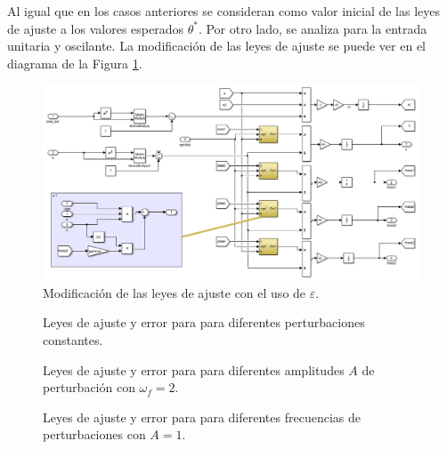 \documentclass[letterpaper,11pt]{article} %
\begin{document}
Al igual que en los casos anteriores se consideran como valor inicial de las leyes de ajuste a los valores esperados $\theta^*$. Por otro lado, se analiza para la entrada unitaria y oscilante. La modificación de las leyes de ajuste se puede ver en el diagrama de la Figura \ref{e1}.
\begin{figure}
	\centering
	\includegraphics[width=14cm]{e1.png}
	\caption{Modificación de las leyes de ajuste con el uso de $\varepsilon$.}
	\label{e1}
\end{figure}
\newpage
\begin{figure}[h]
	\centering
	\captionsetup{justification=centering}
	\caption{Leyes de ajuste y error para para diferentes perturbaciones constantes.}
	\label{em1}
\end{figure}
\newpage
\begin{figure}[h]
	\centering
	\captionsetup{justification=centering}
	\caption{Leyes de ajuste y error para para diferentes amplitudes $A$ de perturbación con $\omega_f =2$.}
	\label{em2}
\end{figure}
\newpage
\begin{figure}[h]
	\centering
	\captionsetup{justification=centering}
	\caption{Leyes de ajuste y error para para diferentes frecuencias de perturbaciones con $A=1$.}
	\label{em3}
\end{figure}
\end{document}
